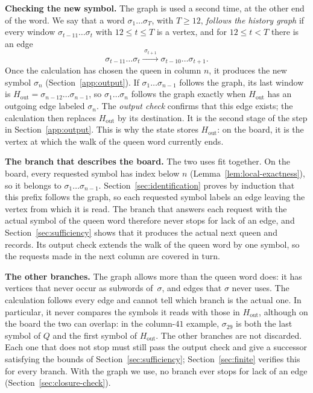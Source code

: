 \medskip\noindent
\textbf{Checking the new symbol.}
The graph is used a second time, at the other end of the word.
We say that a word $\sigma_1\dots\sigma_T$, with $T\ge12$,
\emph{follows the history graph} if every window
$\sigma_{t-11}\dots\sigma_t$ with $12\le t\le T$ is a vertex, and
for $12\le t<T$ there is an edge
\[
 \sigma_{t-11}\dots\sigma_t\xrightarrow{\;\sigma_{t+1}\;}
 \sigma_{t-10}\dots\sigma_{t+1}.
\]
Once the calculation has chosen the queen in column $n$, it produces
the new symbol $\sigma_n$ (Section~\ref{app:output}). If
$\sigma_1\dots\sigma_{n-1}$ follows the graph, its last window is
$H_{\mathrm{out}}=\sigma_{n-12}\dots\sigma_{n-1}$, so
$\sigma_1\dots\sigma_n$ follows the graph exactly when
$H_{\mathrm{out}}$ has an outgoing edge labeled $\sigma_n$. The
\emph{output check} confirms that this edge exists; the calculation
then replaces $H_{\mathrm{out}}$ by its destination. It is the second
stage of the step in Section~\ref{app:output}. This is why the
state stores $H_{\mathrm{out}}$: on the board, it is the vertex at
which the walk of the queen word currently ends.

\medskip\noindent
\textbf{The branch that describes the board.}
The two uses fit together. On the board, every requested symbol has
index below $n$ (Lemma~\ref{lem:local-exactness}), so it belongs to
$\sigma_1\dots\sigma_{n-1}$. Section~\ref{sec:identification} proves
by induction that this prefix follows the graph, so each requested
symbol labels an edge leaving the vertex from which it is read. The
branch that answers each request with the actual symbol of the queen
word therefore never stops
for lack of an edge, and Section~\ref{sec:sufficiency} shows that it
produces the actual next queen and records. Its output check extends
the walk of the queen word by one symbol, so the requests made in
the next column are covered in turn.

\medskip\noindent
\textbf{The other branches.}
The graph allows more than the queen word does: it has vertices that
never occur as subwords of~$\sigma$, and edges that $\sigma$ never
uses. The calculation follows every edge and cannot tell which
branch is the actual one. In particular, it never compares the
symbols it reads with those in $H_{\mathrm{out}}$, although on the
board the two can overlap: in the column-$41$ example, $\sigma_{29}$
is both the last symbol of $Q$ and the first symbol of
$H_{\mathrm{out}}$. The other branches are not discarded. Each one
that does not stop must still pass the output check and give a
successor satisfying the bounds of Section~\ref{sec:sufficiency};
Section~\ref{sec:finite} verifies this for every branch. With the
graph we use, no branch ever stops for lack of an edge
(Section~\ref{sec:closure-check}).


